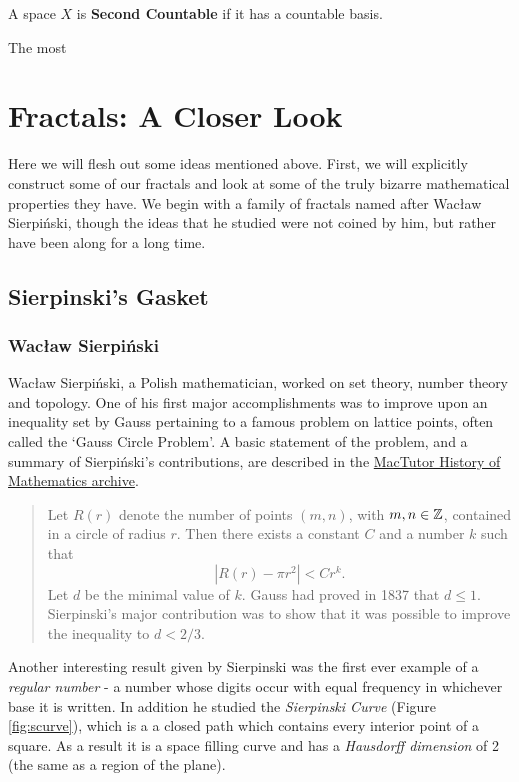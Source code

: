 \documentclass[11pt,oneside,final]{article}
\begin{document}
\begin{dfn} A space \(X\) is \textbf{Second Countable} if it has a countable
	basis. 
\end{dfn}

The most 
\section{Fractals: A Closer Look}
Here we will flesh out some ideas mentioned above. First, we will explicitly
construct some of our fractals and look at some of the truly bizarre
mathematical properties they have. We begin with a family of fractals named
after Wac\l{}aw Sierpi\'nski, though the ideas that he studied were not coined
by him, but rather have been along for a long time.



\subsection{Sierpinski's Gasket}
\subsubsection{Wac\l{}aw Sierpi\'nski} Wac\l{}aw Sierpi\'nski, a Polish 
mathematician, worked on set theory, number theory and topology. One of his
first major accomplishments was to improve upon an inequality set by Gauss
\cite{st-andrews} pertaining to a famous problem on lattice points, often
called the `Gauss Circle Problem'. A basic statement of the problem, and a 
summary of Sierpi\'nski's contributions, are described in the 
\href{http://www-history.mcs.st-andrews.ac.uk/}{MacTutor History of Mathematics
archive}.

\begin{quotation}
	Let \(R(r)\) denote the number of points \((m,n)\), with \(m,n \in \mathbb Z\),
	contained in a circle of radius \(r\). Then there exists a constant \(C\)
	and a number \(k\) such that 
	\[|R(r) - \pi r^2| < Cr^k.\] 
	Let \(d\) be the minimal value of \(k\). Gauss had proved in 1837 that \(d
	\leq 1\). Sierpinski's major contribution was to show that it was possible
	to improve the inequality to \(d < 2/3\).\cite{st-andrews}
\end{quotation}

Another interesting result given by Sierpinski was the first ever example of 
a {\em regular number} - a number whose digits occur with equal frequency in
whichever base it is written.\cite{st-andrews} In addition he studied the
{\em Sierpinski Curve} (Figure \ref{fig:scurve}), which is a a closed path which contains every 
interior point of a square. As a result it is a space filling curve and has
a {\em Hausdorff dimension} of 2 (the same as a region of the plane).\\
\end{document}
